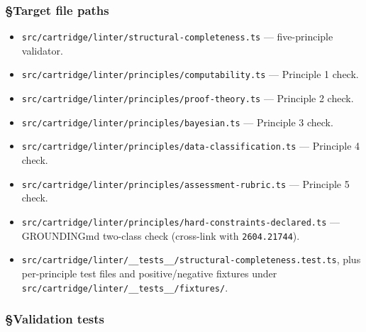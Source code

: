 \documentclass[11pt,letterpaper]{article}
\newcommand{\arxivid}[1]{\texttt{\textcolor{accent}{#1}}}
\providecommand{\tightlist}{\setlength{\itemsep}{0pt}\setlength{\parskip}{0pt}}
\begin{document}
\subsubsection{§Target file paths}

\begin{itemize}
\tightlist
\item
  \texttt{src/cartridge/linter/structural-completeness.ts} ---
  five-principle validator.
\item
  \texttt{src/cartridge/linter/principles/computability.ts} ---
  Principle 1 check.
\item
  \texttt{src/cartridge/linter/principles/proof-theory.ts} --- Principle
  2 check.
\item
  \texttt{src/cartridge/linter/principles/bayesian.ts} --- Principle 3
  check.
\item
  \texttt{src/cartridge/linter/principles/data-classification.ts} ---
  Principle 4 check.
\item
  \texttt{src/cartridge/linter/principles/assessment-rubric.ts} ---
  Principle 5 check.
\item
  \texttt{src/cartridge/linter/principles/hard-constraints-declared.ts}
  --- GROUNDINGmd two-class check (cross-link with \arxivid{2604.21744}).
\item
  \texttt{src/cartridge/linter/\_\_tests\_\_/structural-completeness.test.ts},
  plus per-principle test files and positive/negative fixtures under
  \texttt{src/cartridge/linter/\_\_tests\_\_/fixtures/}.
\end{itemize}

\subsubsection{§Validation tests}
\end{document}

